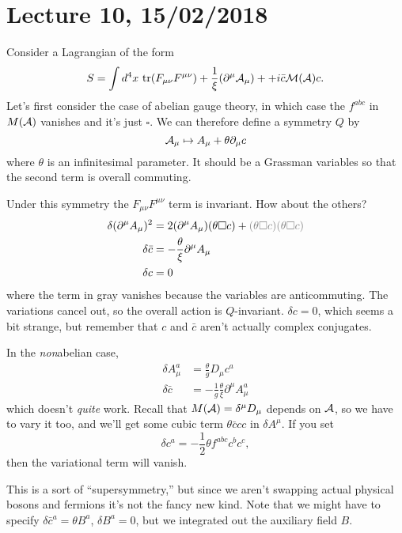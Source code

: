 \section*{Lecture 10, 15/02/2018}
Consider a Lagrangian of the form
\[
S = \int d^4x\, \operatorname{tr}(F_{\mu \nu} F^{\mu \nu}) + \frac{1}{\xi} (\partial^\mu \mathcal{A}_\mu) ++ i \bar c \mathcal M(\mathcal{A}) c.
\]
Let's first consider the case of abelian gauge theory, in which case the $f^{abc}$ in $M(\mathcal{A})$ vanishes and it's just $\square$.
We can therefore define a symmetry $Q$ by
\[
\mathcal{A}_\mu \mapsto A_\mu + \theta \partial_\mu c
\]
where $\theta$ is an infinitesimal parameter.
It should be a Grassman variables so that the second term is overall commuting.

Under this symmetry the $F_{\mu \nu} F^{\mu \nu}$ term is invariant.
How about the others?
\begin{align*}
\delta (\partial^\mu A_\mu)^2 &= 2 (\partial^\mu A_\mu)(\theta\square c) + \fade{(\theta \square c) (\theta \square c)}\\
\delta \bar c &= -\frac{\theta}{\xi} \partial^\mu A_\mu \\
\delta c &= 0
\end{align*}
where the term in gray vanishes because the variables are anticommuting.
The variations cancel out, so the overall action is $Q$-invariant.
$\delta c = 0$, which seems a bit strange, but remember that $c$ and $\bar c$ aren't actually complex conjugates.

In the \emph{non}abelian case,
\begin{align*}
\delta A_\mu^a &= \frac{\theta}{g} D_\mu c^a\\
\delta \bar c &= - \frac{1}{g} \frac{\theta}{\xi} \partial^\mu A_\mu^a
\end{align*}
which doesn't \emph{quite} work.
Recall that $M(\mathcal{A}) = \delta^\mu D_\mu$ depends on $\mathcal{A}$, so we have to vary it too, and we'll get some cubic term $\theta \bar{c} c c $ in $\delta A^\mu$.
If you set
\[
 \delta c^a = -\frac{1}{2} \theta f^{abc} c^b c^c,
\] 
then the variational term will vanish.

This is a sort of ``supersymmetry,'' but since we aren't swapping actual physical bosons and fermions it's not the fancy new kind.
Note that we might have to specify $\delta \bar c ^a = \theta B^a$, $\delta B^a = 0$, but we integrated out the auxiliary field $B$.

